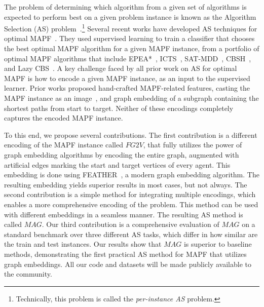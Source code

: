 \documentclass[letterpaper]{article} %
\newcommand{\Carmel}[1]{}
\newcommand{\Roni}[1]{}
\newcommand{\fgtv}[1]{\ensuremath{\textit{FG2V}}\xspace}
\newcommand{\mapfgas}[1]{\ensuremath{\textit{MAG}}\xspace}
\begin{document}
The problem of determining which algorithm from a given set of algorithms is expected to perform best on a given problem instance is known as the
Algorithm Selection (AS) problem~\cite{rice1976algorithm,kerschke2019automated}.\footnote{Technically, this problem is called the \emph{per-instance AS} problem.}
Several recent works have developed AS techniques for optimal MAPF~\cite{kaduri2020algorithm,ren2021mapfast,alkazzi2022mapfaster}.
They used supervised learning to
train a classifier that chooses the best optimal MAPF algorithm for a given MAPF instance, from a portfolio of optimal MAPF algorithms that include EPEA*~\cite{goldenberg2014enhanced}, ICTS~\cite{sharon2013increasing}, SAT-MDD~\cite{surynek2016efficient}, CBSH~\cite{felner2018adding}, and Lazy CBS~\cite{gange2019lazy}.
A key challenge faced by all prior work on AS for optimal MAPF is how to encode a given MAPF instance, as an input to the supervised learner. Prior works proposed hand-crafted MAPF-related features, casting the MAPF instance as an image~\cite{alkazzi2022mapfaster}, and graph embedding of a subgraph containing the shortest paths from start to target. Neither of these encodings completely captures the encoded MAPF instance.



To this end, we propose several contributions.
The first contribution is a different encoding of the MAPF instance called \fgtv\ , that fully utilizes the power of graph embedding algorithms by encoding the entire graph, augmented with artificial edges marking the start and target vertices of every agent.
This embedding is done using FEATHER~\cite{rozemberczki2020characteristic}, a modern graph embedding algorithm. %
The resulting embedding yields superior results in most cases, but not always.
The second contribution is a simple method for integrating multiple encodings, which enables a more comprehensive encoding of the problem. This method can be used with different embeddings in a seamless manner. The resulting AS method is called \mapfgas\ .
Our third contribution is a comprehensive evaluation of \mapfgas\ on a standard benchmark over three different AS tasks, which differ in how similar are the train and test instances. Our results show that \mapfgas\ is superior to baseline methods, demonstrating the first practical AS method for MAPF that utilizes graph embeddings. All our code and datasets will be made publicly available to the community.
\end{document}
